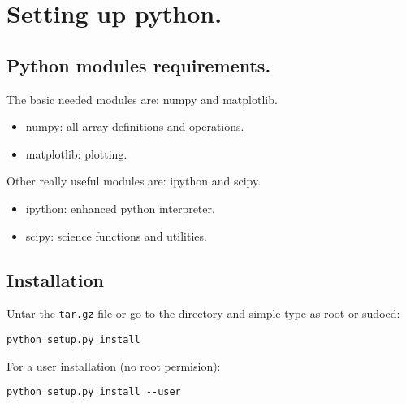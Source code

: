 \documentclass[a4paper,12pt]{article}
\begin{document}
    
\section{Setting up python.}
\subsection{Python modules requirements.}
The basic needed modules are: numpy and matplotlib.
\begin{itemize}
 \item numpy: all array definitions and operations.
  \item matplotlib: plotting.
\end{itemize}

Other really useful modules are: ipython and scipy.

\begin{itemize}
 \item ipython: enhanced python interpreter.
  \item scipy: science functions and utilities.
\end{itemize}


\subsection{Installation}
Untar the \texttt{tar.gz} file or go to the directory and simple type as root or sudoed:
\begin{verbatim}
python setup.py install
\end{verbatim}
For a user installation (no root permision):
\begin{verbatim}
python setup.py install --user
\end{verbatim}
\end{document}
